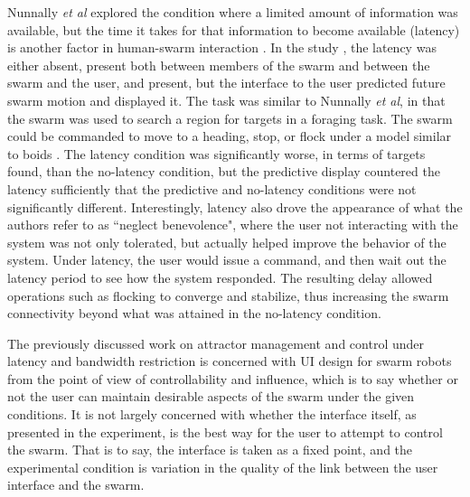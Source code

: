 Nunnally \emph{et al} explored the condition where a limited amount of information was available, but the time it takes for that information to become available (latency) is another factor in human-swarm interaction \citep{walker2012neglect}.
In the study , the latency was either absent, present both between members of the swarm and between the swarm and the user, and present, but the interface to the user predicted future swarm motion and displayed it. 
The task was similar to Nunnally \emph{et al}, in that the swarm was used to search a region for targets in a foraging task. 
The swarm could be commanded to move to a heading, stop, or flock under a model similar to boids \citep{reynolds1987flocks}.
The latency condition was significantly worse, in terms of targets found, than the no-latency condition, but the predictive display countered the latency sufficiently that the predictive and no-latency conditions were not significantly different. 
Interestingly, latency also drove the appearance of what the authors refer to as ``neglect benevolence", where the user not interacting with the system was not only tolerated, but actually helped improve the behavior of the system. 
Under latency, the user would issue a command, and then wait out the latency period to see how the system responded.
The resulting delay allowed operations such as flocking to converge and stabilize, thus increasing the swarm connectivity beyond what was attained in the no-latency condition. 

The previously discussed work on attractor management and control under latency and bandwidth restriction is concerned with UI design for swarm robots from the point of view of controllability and influence, which is to say whether or not the user can maintain desirable aspects of the swarm under the given conditions. 
It is not largely concerned with whether the interface itself, as presented in the experiment, is the best way for the user to attempt to control the swarm.
That is to say, the interface is taken as a fixed point, and the experimental condition is variation in the quality of the link between the user interface and the swarm. 


